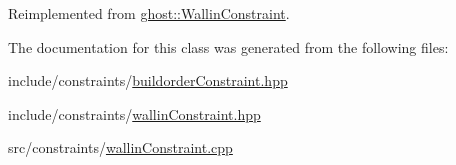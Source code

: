 Reimplemented from \hyperlink{classghost_1_1WallinConstraint_af2d6f103c844a14745b7de6c656f9981}{ghost\-::\-Wallin\-Constraint}.



The documentation for this class was generated from the following files\-:\begin{DoxyCompactItemize}
\item 
include/constraints/\hyperlink{buildorderConstraint_8hpp}{buildorder\-Constraint.\-hpp}\item 
include/constraints/\hyperlink{wallinConstraint_8hpp}{wallin\-Constraint.\-hpp}\item 
src/constraints/\hyperlink{wallinConstraint_8cpp}{wallin\-Constraint.\-cpp}\end{DoxyCompactItemize}
